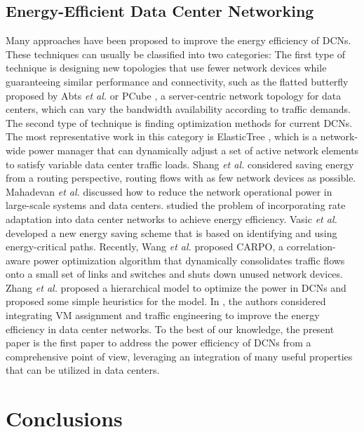 \documentclass[journal,single-space,two column,twoside,10pt]{IEEEtran}
\begin{document}
\subsection{Energy-Efficient Data Center Networking}

Many approaches have been proposed to improve the energy efficiency of DCNs. These techniques can usually be classified into two categories: The first type of technique is designing new topologies that use fewer network devices while guaranteeing similar performance and connectivity, such as the flatted butterfly proposed by Abts \emph{et al.} \cite{Abts_Marty-2010} or PCube \cite{Huang_Jia-2011}, a server-centric network topology for data centers, which can vary the bandwidth availability according to traffic demands. The second type of technique is finding optimization methods for current DCNs. The most representative work in this category is ElasticTree \cite{Heller_Seetharaman-2010}, which is a network-wide power manager that can dynamically adjust a set of active network elements to satisfy variable data center traffic loads. Shang \emph{et al.} \cite{Shang_Li-2010} considered saving energy from a routing perspective, routing flows with as few network devices as possible. Mahadevan \emph{et al.} \cite{Mahadevan_Banerjee-2011} discussed how to reduce the network operational power in large-scale systems and data centers. \cite{Wang_Zhang-NCA-2013} studied the problem of incorporating rate adaptation into data center networks to achieve energy efficiency. Vasic \emph{et al.} \cite{Vasic_Bhurat-2011} developed a new energy saving scheme that is based on identifying and using energy-critical paths. Recently, Wang \emph{et al.} \cite{Wang_Yao-2012} proposed CARPO, a correlation-aware power optimization algorithm that dynamically consolidates traffic flows onto a small set of links and switches and shuts down unused network devices. Zhang \emph{et al.} \cite{Zhang_Ansari-2012} proposed a hierarchical model to optimize the power in DCNs and proposed some simple heuristics for the model. In \cite{Wang_Zhang-Greenmetrics-2013}, the authors considered integrating VM assignment and traffic engineering to improve the energy efficiency in data center networks. To the best of our knowledge, the present paper is the first paper to address the power efficiency of DCNs from a comprehensive point of view, leveraging an integration of many useful properties that can be utilized in data centers.


\section{Conclusions}
\label{sec:conclusion}
\end{document}
